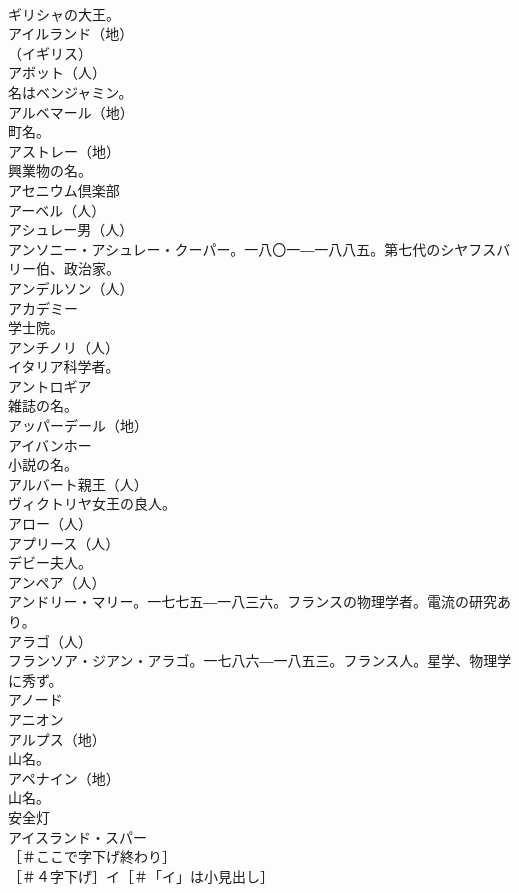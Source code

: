 \documentclass[8pt]{extreport}
\begin{document}
\begin{CJK}{UTF8}{min}
\\	ギリシャの大王。
\\	アイルランド（地）
\\	（イギリス）
\\	アボット（人）
\\	名はベンジャミン。
\\	アルベマール（地）
\\	町名。
\\	アストレー（地）
\\	興業物の名。
\\	アセニウム倶楽部 
\\	アーベル（人）
\\	アシュレー男（人）
\\	アンソニー・アシュレー・クーパー。一八〇一―一八八五。第七代のシヤフスバリー伯、政治家。
\\	アンデルソン（人）
\\	アカデミー 
\\	学士院。
\\	アンチノリ（人）
\\	イタリア科学者。
\\	アントロギア 
\\	雑誌の名。
\\	アッパーデール（地）
\\	アイバンホー 
\\	小説の名。
\\	アルバート親王（人）
\\	ヴィクトリヤ女王の良人。
\\	アロー（人）
\\	アプリース（人）
\\	デビー夫人。
\\	アンペア（人）
\\	アンドリー・マリー。一七七五―一八三六。フランスの物理学者。電流の研究あり。
\\	アラゴ（人）
\\	フランソア・ジアン・アラゴ。一七八六―一八五三。フランス人。星学、物理学に秀ず。
\\	アノード 
\\	アニオン 
\\	アルプス（地）
\\	山名。
\\	アペナイン（地）
\\	山名。
\\	安全灯 
\\	アイスランド・スパー 
\\	［＃ここで字下げ終わり］
\\	［＃４字下げ］イ［＃「イ」は小見出し］

\end{CJK}
\end{document}
